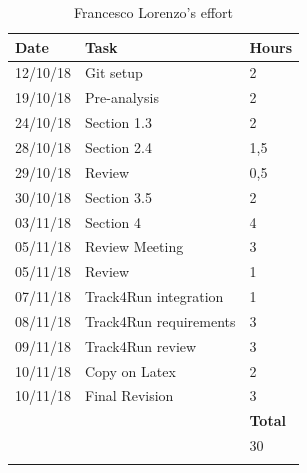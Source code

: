 \documentclass[titlepage]{article}
\begin{document}
	\begin{longtable}{| p{2 cm} | p{5 cm} | p{2 cm} |} 
		\hline
		{\bf Date} & {\bf Task} & {\bf Hours}\\
		\hline
		12/10/18 & Git setup & 2 \\
		19/10/18 & Pre-analysis & 2 \\
		24/10/18 & Section 1.3 & 2 \\
		28/10/18 & Section 2.4 & 1,5 \\
		29/10/18 & Review & 0,5 \\
		30/10/18 & Section 3.5 & 2 \\
		03/11/18 & Section 4 & 4 \\
		05/11/18 & Review Meeting & 3 \\
		05/11/18 & Review & 1\\
		07/11/18 & Track4Run integration & 1 \\
		08/11/18 & Track4Run requirements & 3 \\
		09/11/18 & Track4Run review & 3 \\
		10/11/18 & Copy on Latex & 2 \\
		10/11/18 & Final Revision & 3 \\
		\hline
		& & {\bf Total} \\
		\hline
		& & 30 \\
		\hline
		\caption{Francesco Lorenzo's effort}
	\end{longtable}

	
\end{document}
